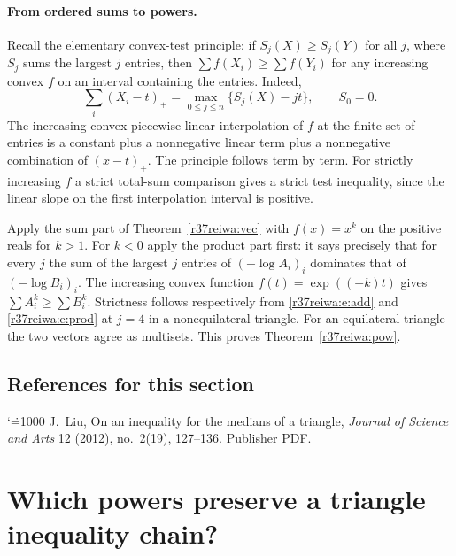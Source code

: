 \documentclass[11pt,a4paper]{article}
\makeatletter
\numberwithin{equation}{section}
\theoremstyle{definition}
\theoremstyle{remark}
\renewenvironment{thebibliography}[1]
 {\subsection*{References for this section}\small
  \list{\@biblabel{\@arabic\c@enumiv}}
       {\settowidth\labelwidth{\@biblabel{#1}}\leftmargin\labelwidth
        \advance\leftmargin\labelsep\@openbib@code
        \usecounter{enumiv}\let\p@enumiv\@empty
        \renewcommand\theenumiv{\@arabic\c@enumiv}}
  \sloppy\clubpenalty4000\widowpenalty4000\sfcode`\.=1000\relax}
 {\def\@noitemerr{\@latex@warning{Empty bibliography}}\endlist}
\makeatother
\begin{document}
\paragraph{From ordered sums to powers.}
Recall the elementary convex-test principle: if $S_j(X)\ge S_j(Y)$ for all $j$, where $S_j$ sums the largest $j$ entries, then $\sum f(X_i)\ge\sum f(Y_i)$ for any increasing convex $f$ on an interval containing the entries. Indeed,
\[
 \sum_i(X_i-t)_+=\max_{0\le j\le n}\{S_j(X)-jt\},\qquad S_0=0.
\]
The increasing convex piecewise-linear interpolation of $f$ at the finite set of entries is a constant plus a nonnegative linear term plus a nonnegative combination of $(x-t)_+$. The principle follows term by term. For strictly increasing $f$ a strict total-sum comparison gives a strict test inequality, since the linear slope on the first interpolation interval is positive.

Apply the sum part of Theorem~\ref{r37reiwa:vec} with $f(x)=x^k$ on the positive reals for $k>1$. For $k<0$ apply the product part first: it says precisely that for every $j$ the sum of the largest $j$ entries of $(-\log A_i)_i$ dominates that of $(-\log B_i)_i$. The increasing convex function $f(t)=\exp((-k)t)$ gives $\sum A_i^k\ge\sum B_i^k$. Strictness follows respectively from \eqref{r37reiwa:e:add} and \eqref{r37reiwa:e:prod} at $j=4$ in a nonequilateral triangle. For an equilateral triangle the two vectors agree as multisets. This proves Theorem~\ref{r37reiwa:pow}.

\begin{thebibliography}{1}
 J.~Liu, On an inequality for the medians of a triangle, \emph{Journal of Science and Arts} 12 (2012), no.~2(19), 127--136. \href{https://josa.ro/docs/josa_2012_2/a_03_Liu_J.pdf}{Publisher PDF}.
\end{thebibliography}

\par\endgroup

\begingroup

\section{\texorpdfstring{Which powers preserve a triangle inequality chain?}{Which powers preserve a triangle inequality chain?}}\label{section:r37keio}
\par\medskip
\end{document}
